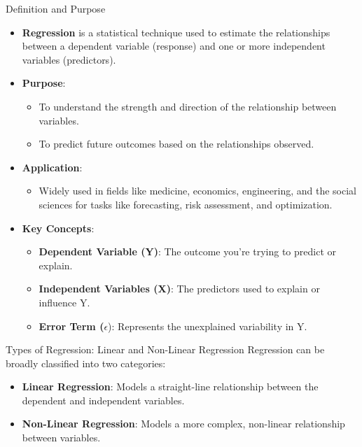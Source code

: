 \documentclass[
  18 pt,
  ignorenonframetext,
  aspectratio=1610,
]{beamer}
\providecommand{\tightlist}{%
  \setlength{\itemsep}{0pt}\setlength{\parskip}{0pt}}\usepackage{longtable,booktabs,array}
\begin{document}
\begin{frame}{Definition and Purpose}
\protect\hypertarget{definition-and-purpose}{}
\begin{itemize}
\tightlist
\item
  \textbf{Regression} is a statistical technique used to estimate the
  relationships between a dependent variable (response) and one or more
  independent variables (predictors).
\item
  \textbf{Purpose}:

  \begin{itemize}
  \tightlist
  \item
    To understand the strength and direction of the relationship between
    variables.
  \item
    To predict future outcomes based on the relationships observed.
  \end{itemize}
\item
  \textbf{Application}:

  \begin{itemize}
  \tightlist
  \item
    Widely used in fields like medicine, economics, engineering, and the
    social sciences for tasks like forecasting, risk assessment, and
    optimization.
  \end{itemize}
\item
  \textbf{Key Concepts}:

  \begin{itemize}
  \tightlist
  \item
    \textbf{Dependent Variable (Y)}: The outcome you're trying to
    predict or explain.
  \item
    \textbf{Independent Variables (X)}: The predictors used to explain
    or influence Y.
  \item
    \textbf{Error Term (}\(\epsilon\)): Represents the unexplained
    variability in Y.
  \end{itemize}
\end{itemize}
\end{frame}

\begin{frame}{Types of Regression: Linear and Non-Linear Regression}
\protect\hypertarget{types-of-regression-linear-and-non-linear-regression}{}
Regression can be broadly classified into two categories:

\begin{itemize}
\tightlist
\item
  \textbf{Linear Regression}: Models a straight-line relationship
  between the dependent and independent variables.
\item
  \textbf{Non-Linear Regression}: Models a more complex, non-linear
  relationship between variables.
\end{itemize}
\end{frame}
\end{document}
